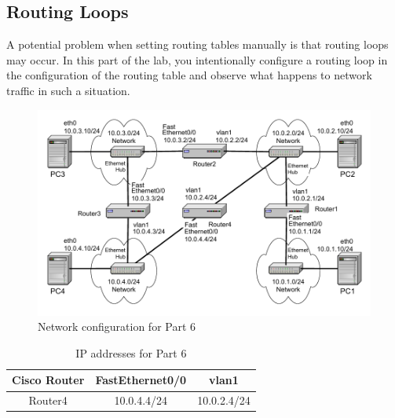 \newpage
\subsection{Routing Loops}

A potential problem when setting routing tables manually is that routing loops may occur. In this part of the lab, you intentionally configure a routing loop in the configuration of the routing table and observe what happens to network traffic in such a situation.

\begin{figure}[h!t]
	\centering
	\includegraphics[width=\linewidth]{graphics/lab3-network3-updated.pdf}	
	\caption{Network configuration for Part 6}
	\label{fig:lab3-network3}
\end{figure}

\begin{table}[h!t]
	\centering
	\begin{tabular}{| c | c | c |}	
		\hline
		\textbf{Cisco Router} & \textbf{FastEthernet0/0} & \textbf{vlan1} \\ \hline
		Router4 & 10.0.4.4/24 & 10.0.2.4/24 \\ \hline
	\end{tabular}
	\caption{IP addresses for Part 6}
	\label{tab:lab3-network3}
\end{table}

